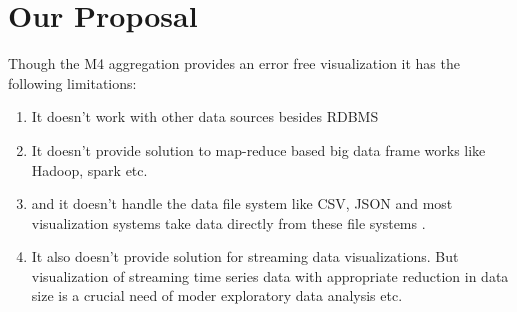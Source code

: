 \section{Our Proposal}
Though the M4 aggregation provides an error free visualization it has the following limitations:
\begin{enumerate}
	\item It doesn't work with other data sources besides RDBMS
	\item It doesn't provide solution to map-reduce based big data frame works like Hadoop, spark etc.
	\item and it doesn't handle the data file system like CSV, JSON and most visualization systems take data directly from these file systems \cite{bostock2011d3}.
	\item It also doesn't provide solution for streaming data visualizations. But visualization of streaming time series data with appropriate reduction in data size is a crucial need of moder exploratory data analysis etc.
\end{enumerate}